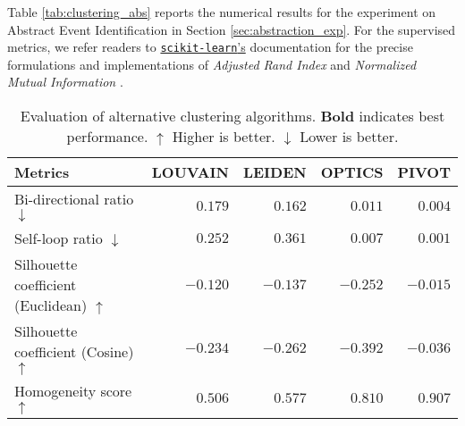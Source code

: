 Table \ref{tab:clustering_abs} reports the numerical results for the experiment on Abstract Event Identification in Section \ref{sec:abstraction_exp}. For the supervised metrics, we refer readers to \href{https://scikit-learn.org/stable/modules/clustering.html}{\texttt{scikit-learn}'s} documentation for the precise formulations and implementations of \textit{Adjusted Rand Index} \citep{steinley2004properties} and \textit{Normalized Mutual Information} \citep{vinh2009information}. 

\begin{table*}[hbt!]
\centering
\begin{tabular}{l|r r r r}
\toprule
Metrics       & \textbf{LOUVAIN} & \textbf{LEIDEN} & \textbf{OPTICS} & \textbf{PIVOT}   \\
\midrule
Bi-directional ratio $\downarrow$               & $0.179$    & $0.162$   & $0.011$   & $\mathbf{0.004}$  \\
Self-loop ratio    $\downarrow$                & $0.252$    & $0.361$   & $0.007$   & $\mathbf{0.001}$  \\
Silhouette coefficient (Euclidean) $\uparrow$ & $-0.120$   & $-0.137$  & $-0.252$  & $\mathbf{-0.015}$ \\
Silhouette coefficient (Cosine) $\uparrow$    & $-0.234$   & $-0.262$  & $-0.392$  & $\mathbf{-0.036}$ \\
Homogeneity score $\uparrow$  & $0.506$  & $0.577$  & $0.810$   & $\mathbf{0.907}$ \\ 
\bottomrule
\end{tabular}
\caption{Evaluation of alternative clustering algorithms. \textbf{Bold} indicates best performance. $\uparrow$ Higher is better. $\downarrow$ Lower is better.} \label{tab:clustering}
\end{table*}


